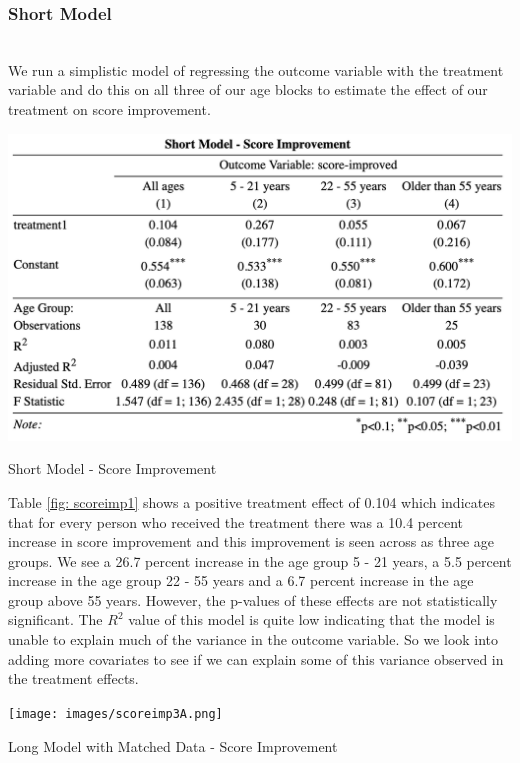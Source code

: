 \documentclass[journal,onecolumn, 12pt]{article}
\begin{document}
\subsubsection*{Short Model}\\
We run a simplistic model of regressing the outcome variable with the treatment variable and do this on all three of our age blocks to estimate the effect of our treatment on score improvement.

\begin{table}[h]
    \centering
    \includegraphics[scale = 0.6]{images/score-imp1.png}
    \caption{Short Model - Score Improvement}
    \label{fig: scoreimp1}
\end{table}

\noindent
Table \ref{fig: scoreimp1} shows a positive treatment effect of 0.104 which indicates that for every person who received the treatment there was a 10.4 percent increase in  score improvement and this improvement is seen across as three age groups. We see a 26.7 percent increase in the age group 5 - 21 years, a 5.5 percent increase in the age group 22 - 55 years and a 6.7 percent increase in the age group above 55 years. However, the p-values of these effects are not statistically significant. The $R^2$ value of this model is quite low indicating that the model is unable to explain much of the variance in the outcome variable. So we look into adding more covariates to see if we can explain some of this variance observed in the treatment effects.

\begin{table}[!t]
    \centering
    \texttt{[image: images/scoreimp3A.png]}
    \caption{Long Model with Matched Data - Score Improvement}
    \label{table: scoreimp3}
\end{table}
\end{document}
